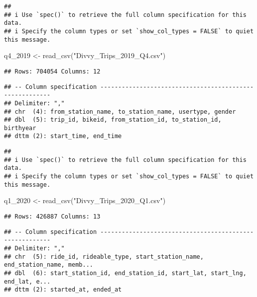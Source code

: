 \documentclass[
]{article}
\newenvironment{Shaded}{\begin{snugshade}}{\end{snugshade}}
\newcommand{\FunctionTok}[1]{\textcolor[rgb]{0.00,0.00,0.00}{#1}}
\newcommand{\NormalTok}[1]{#1}
\newcommand{\OtherTok}[1]{\textcolor[rgb]{0.56,0.35,0.01}{#1}}
\newcommand{\StringTok}[1]{\textcolor[rgb]{0.31,0.60,0.02}{#1}}
\begin{document}
\begin{verbatim}
## 
## i Use `spec()` to retrieve the full column specification for this data.
## i Specify the column types or set `show_col_types = FALSE` to quiet this message.
\end{verbatim}

\begin{Shaded}
\begin{Highlighting}[]
\NormalTok{q4\_2019 }\OtherTok{\textless{}{-}} \FunctionTok{read\_csv}\NormalTok{(}\StringTok{"Divvy\_Trips\_2019\_Q4.csv"}\NormalTok{)}
\end{Highlighting}
\end{Shaded}

\begin{verbatim}
## Rows: 704054 Columns: 12
\end{verbatim}

\begin{verbatim}
## -- Column specification --------------------------------------------------------
## Delimiter: ","
## chr  (4): from_station_name, to_station_name, usertype, gender
## dbl  (5): trip_id, bikeid, from_station_id, to_station_id, birthyear
## dttm (2): start_time, end_time
\end{verbatim}

\begin{verbatim}
## 
## i Use `spec()` to retrieve the full column specification for this data.
## i Specify the column types or set `show_col_types = FALSE` to quiet this message.
\end{verbatim}

\begin{Shaded}
\begin{Highlighting}[]
\NormalTok{q1\_2020 }\OtherTok{\textless{}{-}} \FunctionTok{read\_csv}\NormalTok{(}\StringTok{"Divvy\_Trips\_2020\_Q1.csv"}\NormalTok{)}
\end{Highlighting}
\end{Shaded}

\begin{verbatim}
## Rows: 426887 Columns: 13
\end{verbatim}

\begin{verbatim}
## -- Column specification --------------------------------------------------------
## Delimiter: ","
## chr  (5): ride_id, rideable_type, start_station_name, end_station_name, memb...
## dbl  (6): start_station_id, end_station_id, start_lat, start_lng, end_lat, e...
## dttm (2): started_at, ended_at
\end{verbatim}
\end{document}

